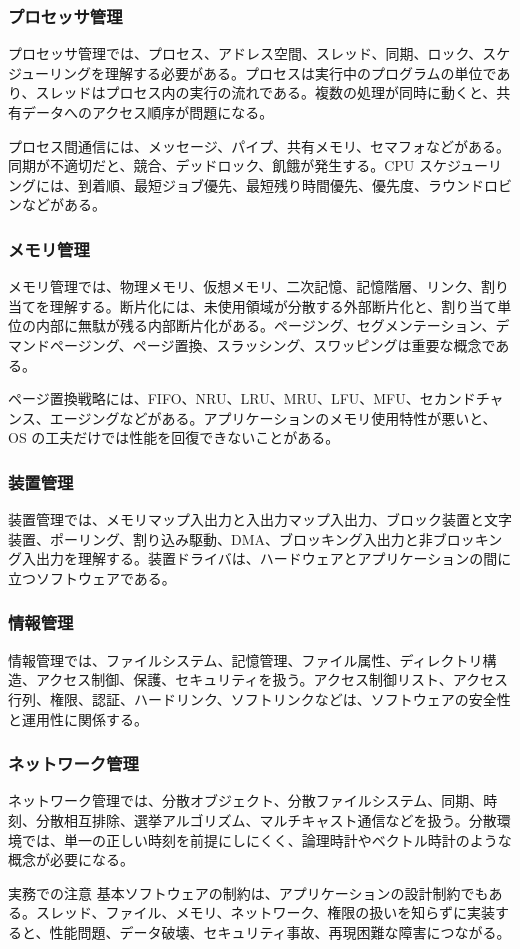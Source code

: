 \subsubsection{プロセッサ管理}

プロセッサ管理では、プロセス、アドレス空間、スレッド、同期、ロック、スケジューリングを理解する必要がある。プロセスは実行中のプログラムの単位であり、スレッドはプロセス内の実行の流れである。複数の処理が同時に動くと、共有データへのアクセス順序が問題になる。

プロセス間通信には、メッセージ、パイプ、共有メモリ、セマフォなどがある。同期が不適切だと、競合、デッドロック、飢餓が発生する。CPU スケジューリングには、到着順、最短ジョブ優先、最短残り時間優先、優先度、ラウンドロビンなどがある。

\subsubsection{メモリ管理}

メモリ管理では、物理メモリ、仮想メモリ、二次記憶、記憶階層、リンク、割り当てを理解する。断片化には、未使用領域が分散する外部断片化と、割り当て単位の内部に無駄が残る内部断片化がある。ページング、セグメンテーション、デマンドページング、ページ置換、スラッシング、スワッピングは重要な概念である。

ページ置換戦略には、FIFO、NRU、LRU、MRU、LFU、MFU、セカンドチャンス、エージングなどがある。アプリケーションのメモリ使用特性が悪いと、OS の工夫だけでは性能を回復できないことがある。

\subsubsection{装置管理}

装置管理では、メモリマップ入出力と入出力マップ入出力、ブロック装置と文字装置、ポーリング、割り込み駆動、DMA、ブロッキング入出力と非ブロッキング入出力を理解する。装置ドライバは、ハードウェアとアプリケーションの間に立つソフトウェアである。

\subsubsection{情報管理}

情報管理では、ファイルシステム、記憶管理、ファイル属性、ディレクトリ構造、アクセス制御、保護、セキュリティを扱う。アクセス制御リスト、アクセス行列、権限、認証、ハードリンク、ソフトリンクなどは、ソフトウェアの安全性と運用性に関係する。

\subsubsection{ネットワーク管理}

ネットワーク管理では、分散オブジェクト、分散ファイルシステム、同期、時刻、分散相互排除、選挙アルゴリズム、マルチキャスト通信などを扱う。分散環境では、単一の正しい時刻を前提にしにくく、論理時計やベクトル時計のような概念が必要になる。

\begin{pointbox}{実務での注意}
基本ソフトウェアの制約は、アプリケーションの設計制約でもある。スレッド、ファイル、メモリ、ネットワーク、権限の扱いを知らずに実装すると、性能問題、データ破壊、セキュリティ事故、再現困難な障害につながる。

\end{pointbox}
